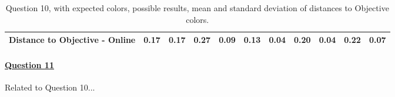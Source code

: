 \begin{table}[H]
{\begin{tabular}{lccccccccccccc}
    \multicolumn{4}{l}{Distance to Objective - Online}                                                                                               & \multicolumn{1}{|c}{0.17}        & \multicolumn{1}{c|}{0.17}    & \multicolumn{1}{|c}{0.27}        & \multicolumn{1}{c|}{0.09}    & \multicolumn{1}{|c}{\textbf{0.13}}       & \multicolumn{1}{c|}{0.04}    & \multicolumn{1}{|c}{0.20}        & \multicolumn{1}{c|}{0.04}    & \multicolumn{1}{|c}{0.22}       & \multicolumn{1}{c|}{0.07}    \\ \hline
    \end{tabular}}
  \caption[Question 10, with expected Results.]{Question 10, with expected colors, possible results, mean and standard deviation of distances to Objective colors.}
  \label{table:lab_q10_expected}
\end{table}
%
\paragraph{\ul{Question 11}}
%
Related to Question 10... \par
%

